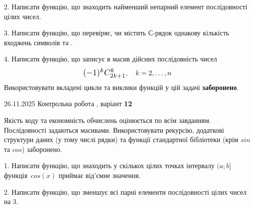 \documentclass[11pt, ukrainian]{article}
\begin{document}
{{{{{{{{{{{\begin {large}
\vspace{2mm}


2. Написати функцію, що знаходить найменший непарний елемент послідовності цілих чисел.

\vspace{2mm}


3. Написати функцію, що перевіряє, чи містить С-рядок однакову кількість входжень символів { та }.

\vspace{2mm}


4. 
Написати функцію, що записує в масив дійсних послідовність чисел
$$\scalebox{1.2}{$(-1)^{k}C_{2k+1}^{k}$}, \quad k=2,\ldots,n$$
\quad Використовувати вкладені цикли та виклики функцій у цій задачі \textbf{заборонено}.

\vspace{2mm}

\end{large}
\vspace{20mm}


{{26.11.2025 Контрольна робота , варіант  \No \textbf { 12 }\par}}


{
Якість коду та економність обчислень оцінюється по всім завданням. Послідовності задаються масивами. Використовувати рекурсію, додаткові структури даних (у тому числі рядки) та функції стандартної бібліотеки (крім $sin$ та $cos$) заборонено.

\vspace{2mm}

\begin {large}
1. Написати функцію, що знаходить у скількох цілих точках інтервалу $(a; b]$ функція~$cos(x)$ приймає від'ємне значення.

\vspace{2mm}


2. Написати функцію, що зменшує всі парні елементи послідовності цілих чисел на 3.


\end{large}}}}}}}}}}}}}
\end{document}
